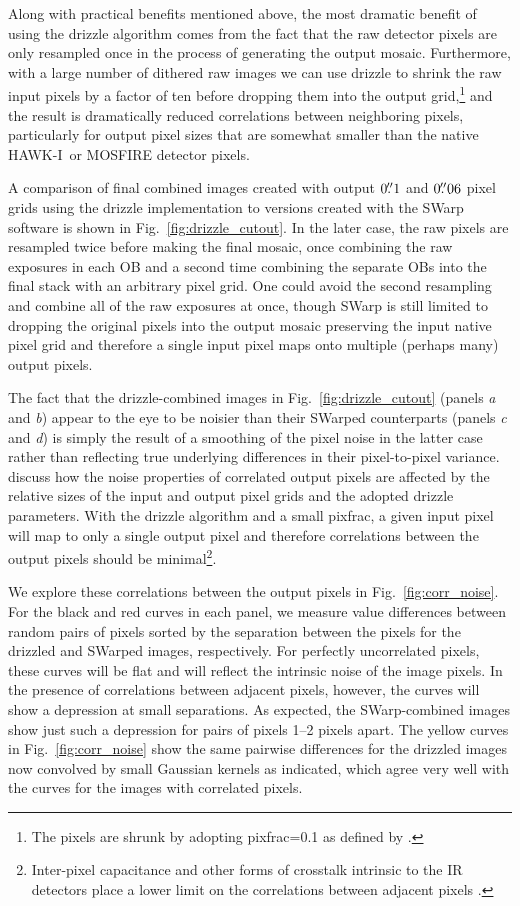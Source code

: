 \documentclass[preprint2]{aastex6}
\gdef\HAWKI{\mbox{HAWK-I}}
\begin{document}
Along with practical benefits mentioned above, the most dramatic benefit of using the drizzle algorithm comes from the fact that the raw detector pixels are only resampled once in the process of generating the output mosaic.  Furthermore, with a large number of dithered raw images we can use drizzle to shrink the raw input pixels by a factor of ten before dropping them into the output grid,\footnote{The pixels are shrunk by adopting pixfrac=0.1 as defined by \cite{fruchter:02}.} and the result is dramatically reduced correlations between neighboring pixels, particularly for output pixel sizes that are somewhat smaller than the native \HAWKI\ or MOSFIRE detector pixels.

A comparison of final combined images created with output $0\mbox{$.\!\!^{\prime\prime}$}1$ and $0\mbox{$.\!\!^{\prime\prime}$}06$ pixel grids using the drizzle implementation to versions created with the SWarp software \citep{swarp} is shown in Fig.~\ref{fig:drizzle_cutout}.  In the later case, the raw pixels are resampled twice before making the final mosaic, once combining the raw exposures in each OB and a second time combining the separate OBs into the final stack with an arbitrary pixel grid.  One could avoid the second resampling and combine all of the raw exposures at once, though SWarp is still limited to dropping the original pixels into the output mosaic preserving the input native pixel grid and therefore a single input pixel maps onto multiple (perhaps many) output pixels.  

The fact that the drizzle-combined images in Fig.~\ref{fig:drizzle_cutout} (panels \textit{a} and \textit{b}) appear to the eye to be noisier than their SWarped counterparts (panels \textit{c} and \textit{d}) is simply the result of a smoothing of the pixel noise in the latter case rather than reflecting true underlying differences in their pixel-to-pixel variance.  \cite{casertano:00} discuss how the noise properties of correlated output pixels are affected by the relative sizes of the input and output pixel grids and the adopted drizzle parameters.  With the drizzle algorithm and a small pixfrac, a given input pixel will map to only a single output pixel and therefore correlations between the output pixels should be minimal\footnote{Inter-pixel capacitance and other forms of crosstalk intrinsic to the IR detectors place a lower limit on the correlations between adjacent pixels \citep{finger:05, hilbert:ipc}.}.  

We explore these correlations between the output pixels in Fig.~\ref{fig:corr_noise}.  For the black and red curves in each panel, we measure value differences between random pairs of pixels sorted by the separation between the pixels for the drizzled and SWarped images, respectively.  For perfectly uncorrelated pixels, these curves will be flat and will reflect the intrinsic noise of the image pixels.  In the presence of correlations between adjacent pixels, however, the curves will show a depression at small separations.  As expected, the SWarp-combined images show just such a depression for pairs of pixels 1--2 pixels apart.  The yellow curves in Fig.~\ref{fig:corr_noise} show the same pairwise differences for the drizzled images now convolved by small Gaussian kernels as indicated, which agree very well with the curves for the images with correlated pixels.  
\end{document}
